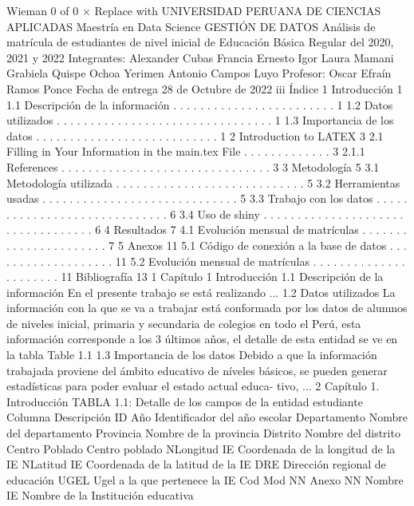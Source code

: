 Wieman
0 of 0
×
Replace with
UNIVERSIDAD PERUANA DE CIENCIAS APLICADAS
Maestría en Data Science
GESTIÓN DE DATOS
Análisis de matrícula de estudiantes de nivel
inicial de Educación Básica Regular del 2020,
2021 y 2022
Integrantes:
Alexander Cubas Francia
Ernesto Igor Laura Mamani
Grabiela Quispe Ochoa
Yerimen Antonio Campos Luyo
Profesor:
Oscar Efraín Ramos Ponce
Fecha de entrega
28 de Octubre de 2022
iii
Índice
1 Introducción 1
1.1 Descripción de la información . . . . . . . . . . . . . . . . . . . . . . . . 1
1.2 Datos utilizados . . . . . . . . . . . . . . . . . . . . . . . . . . . . . . . . 1
1.3 Importancia de los datos . . . . . . . . . . . . . . . . . . . . . . . . . . . 1
2 Introduction to LATEX 3
2.1 Filling in Your Information in the main.tex File . . . . . . . . . . . . . 3
2.1.1 References . . . . . . . . . . . . . . . . . . . . . . . . . . . . . . . 3
3 Metodología 5
3.1 Metodología utilizada . . . . . . . . . . . . . . . . . . . . . . . . . . . . 5
3.2 Herramientas usadas . . . . . . . . . . . . . . . . . . . . . . . . . . . . . 5
3.3 Trabajo con los datos . . . . . . . . . . . . . . . . . . . . . . . . . . . . . 6
3.4 Uso de shiny . . . . . . . . . . . . . . . . . . . . . . . . . . . . . . . . . . 6
4 Resultados 7
4.1 Evolución mensual de matrículas . . . . . . . . . . . . . . . . . . . . . . 7
5 Anexos 11
5.1 Código de conexión a la base de datos . . . . . . . . . . . . . . . . . . . 11
5.2 Evolución mensual de matrículas . . . . . . . . . . . . . . . . . . . . . . 11
Bibliografía 13
1
Capítulo 1
Introducción
1.1 Descripción de la información
En el presente trabajo se está realizando ...
1.2 Datos utilizados
La información con la que se va a trabajar está conformada por los datos de alumnos
de niveles inicial, primaria y secundaria de colegios en todo el Perú, esta información
corresponde a los 3 últimos años, el detalle de esta entidad se ve en la tabla Table 1.1
1.3 Importancia de los datos
Debido a que la información trabajada proviene del ámbito educativo de níveles
básicos, se pueden generar estadísticas para poder evaluar el estado actual educa-
tivo, ...
2 Capítulo 1. Introducción
TABLA 1.1: Detalle de los campos de la entidad estudiante
Columna Descripción
ID Año Identificador del año escolar
Departamento Nombre del departamento
Provincia Nombre de la provincia
Distrito Nombre del distrito
Centro Poblado Centro poblado
NLongitud IE Coordenada de la longitud de la IE
NLatitud IE Coordenada de la latitud de la IE
DRE Dirección regional de educación
UGEL Ugel a la que pertenece la IE
Cod Mod NN
Anexo NN
Nombre IE Nombre de la Institución educativa
